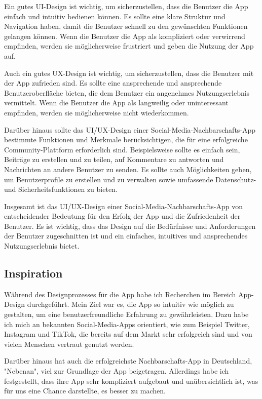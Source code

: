 Ein gutes UI-Design ist wichtig, um sicherzustellen, dass die Benutzer die App einfach und intuitiv bedienen können. Es sollte eine klare Struktur und Navigation haben, damit die Benutzer schnell zu den gewünschten Funktionen gelangen können. Wenn die Benutzer die App als kompliziert oder verwirrend empfinden, werden sie möglicherweise frustriert und geben die Nutzung der App auf.

Auch ein gutes UX-Design ist wichtig, um sicherzustellen, dass die Benutzer mit der App zufrieden sind. Es sollte eine ansprechende und ansprechende Benutzeroberfläche bieten, die dem Benutzer ein angenehmes Nutzungserlebnis vermittelt. Wenn die Benutzer die App als langweilig oder uninteressant empfinden, werden sie möglicherweise nicht wiederkommen.

Darüber hinaus sollte das UI/UX-Design einer Social-Media-Nachbarschafts-App bestimmte Funktionen und Merkmale berücksichtigen, die für eine erfolgreiche Community-Plattform erforderlich sind. Beispielsweise sollte es einfach sein, Beiträge zu erstellen und zu teilen, auf Kommentare zu antworten und Nachrichten an andere Benutzer zu senden. Es sollte auch Möglichkeiten geben, um Benutzerprofile zu erstellen und zu verwalten sowie umfassende Datenschutz- und Sicherheitsfunktionen zu bieten.

Insgesamt ist das UI/UX-Design einer Social-Media-Nachbarschafts-App von entscheidender Bedeutung für den Erfolg der App und die Zufriedenheit der Benutzer. Es ist wichtig, dass das Design auf die Bedürfnisse und Anforderungen der Benutzer zugeschnitten ist und ein einfaches, intuitives und ansprechendes Nutzungserlebnis bietet.
\subsection{Inspiration}
Während des Designprozesses für die App habe ich Recherchen im Bereich App-Design durchgeführt. Mein Ziel war es, die App so intuitiv wie möglich zu gestalten, um eine benutzerfreundliche Erfahrung zu gewährleisten. Dazu habe ich mich an bekannten Social-Media-Apps orientiert, wie zum Beispiel Twitter, Instagram und TikTok, die bereits auf dem Markt sehr erfolgreich sind und von vielen Menschen vertraut genutzt werden.

Darüber hinaus hat auch die erfolgreichste Nachbarschafts-App in Deutschland, "Nebenan", viel zur Grundlage der App beigetragen. Allerdings habe ich festgestellt, dass ihre App sehr kompliziert aufgebaut und unübersichtlich ist, was für uns eine Chance darstellte, es besser zu machen.


